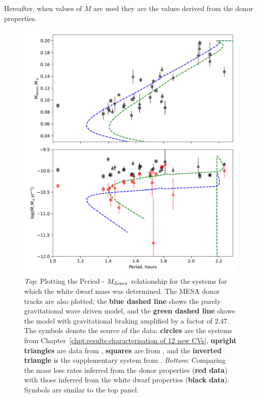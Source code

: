 Hereafter, when values of $\dot M$ are used they are the values derived from the donor properties.

\begin{figure}
    \centering
    \includegraphics[width=\textwidth]{figures/results/Mdot/compare_mdot_from_donor_vs_wd_vs_period_withmasses.pdf}
    \caption{{\it Top}: Plotting the Period - $M_{\rm donor}$ relationship for the systems for which the white dwarf mass was determined.
    The MESA donor tracks are also plotted; the {\bf blue dashed line} shows the purely gravitational wave driven model, and the {\bf green dashed line} shows the model with gravitational braking amplified by a factor of $2.47$. The symbols denote the source of the data: {\bf circles} are the systems from Chapter~\ref{chpt:results:characterisation of 12 new CVs}, {\bf upright triangles} are data from \citet{McAllister2019}, {\bf squares} are from \citet{Savoury2011}, and the {\bf inverted triangle} is the supplementary system from \citet{mcallister2017b}.
        {\it Bottom}: Comparing the mass loss rates inferred from the donor properties ({\bf red data}) with those inferred from the white dwarf properties ({\bf black data}). Symbols are similar to the top panel.}
    \label{fig:massloss and AML:compare Mdot from donor and wd}
\end{figure}

